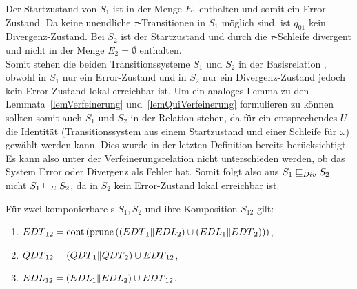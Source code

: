Der Startzustand von $S_1$ ist in der Menge $E_1$ enthalten und somit ein
Error-Zustand. Da keine unendliche $\tau$-Transitionen in $S_1$ möglich sind,
ist $q_{01}$ kein Divergenz-Zustand. Bei $S_2$ ist der Startzustand und durch
die $\tau$-Schleife divergent und nicht in der Menge $E_2=\emptyset$
enthalten.\\
Somit stehen die beiden Transitionssysteme $S_1$ und $S_2$ in der
Basisrelation \DBRel{}, obwohl in $S_1$ nur ein Error-Zustand und in $S_2$ nur
ein Divergenz-Zustand jedoch kein Error-Zustand lokal erreichbar ist. Um ein analoges Lemma zu den
Lemmata~\ref{lemVerfeinerung} und~\ref{lemQuiVerfeinerung} formulieren zu
können sollten somit auch $S_1$ und $S_2$ in der Relation \DRel{} stehen, da
für ein entsprechendes $U$ die Identität (Transitionssystem aus einem
Startzustand und einer Schleife für $\omega$) gewählt werden kann. Dies
wurde in der letzten Definition bereits berücksichtigt. Es
kann also unter der Verfeinerungsrelation \DRel{} nicht unterschieden
werden, ob das System Error oder Divergenz als Fehler hat. Somit folgt also aus
$S_1\sqsubseteq _{Div}{} S_2$ nicht $S_1\sqsubseteq _E{} S_2$, da in $S_2$ kein Error-Zustand lokal
erreichbar ist.


\begin{satz}
\label{satzDivSemantik}
  Für zwei komponierbare \EIO{}s $S_1, S_2$ und ihre Komposition
  $S_{12}$ gilt:
  \begin{enumerate}
    \item $EDT{}_{12}=\mathrm{cont} \left(\mathrm{prune} \left(\left(EDT{}_1\|EDL{}_2\right)\cup
      \left(EDL{}_1\|EDT{}_2\right)\right)\right)$,
    \item $QDT{}_{12}=(QDT{}_1\|QDT{}_2)\cup EDT{}_{12}$,
    \item $EDL{}_{12}=(EDL{}_1\|EDL{}_2)\cup EDT{}_{12}$.
  \end{enumerate}
\end{satz}

